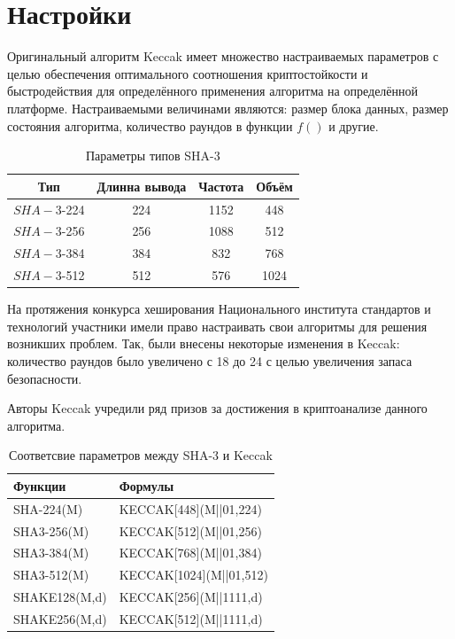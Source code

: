 \documentclass{book}
\begin{document}
\section*{Настройки}
Оригинальный алгоритм Keccak имеет множество настраиваемых параметров с целью обеспечения оптимального соотношения криптостойкости и быстродействия для определённого применения алгоритма на определённой платформе. Настраиваемыми величинами являются: размер блока данных, размер состояния алгоритма, количество раундов в функции $f()$ и другие.

\begin{table}[h]
\caption{Параметры типов SHA-3}
    \centering
    
    \begin{tabular}{|c|c|c|c|}
    \hline
         Тип & Длинна вывода & Частота & Объём  \\ \hline
         $SHA-3$-224& 224 & 1152 & 448  \\ \hline
         $SHA-3$-256& 256 & 1088 & 512  \\ \hline
         $SHA-3$-384& 384 & 832 & 768  \\ \hline
         $SHA-3$-512& 512 &576 & 1024  \\ \hline
    \end{tabular}
    
    \label{tab:my_label}
\end{table}


На протяжения конкурса хеширования Национального института стандартов и технологий участники имели право настраивать свои алгоритмы для решения возникших проблем. Так, были внесены некоторые изменения в Keccak: количество раундов было увеличено с 18 до 24 с целью увеличения запаса безопасности.

Авторы Keccak учредили ряд призов за достижения в криптоанализе данного алгоритма.

\begin{table}
\caption{Соответсвие параметров между SHA-3 и Keccak}
\begin{tabular}{|l|l|}

\hline
Функции       & Формулы                    \\ \hline
SHA-224(M)    & KECCAK{[}448{]}(M||01,224) \\ \hline
SHA3-256(M)   & KECCAK{[}512{]}(M||01,256) \\ \hline
SHA3-384(M)   & KECCAK{[}768{]}(M||01,384) \\ \hline
SHA3-512(M)   & KECCAK{[}1024{]}(M||01,512)\\ \hline
SHAKE128(M,d) & KECCAK{[}256{]}(M||1111,d) \\ \hline
SHAKE256(M,d) & KECCAK{[}512{]}(M||1111,d) \\ \hline
\end{tabular}

\end{table}
\end{document}
